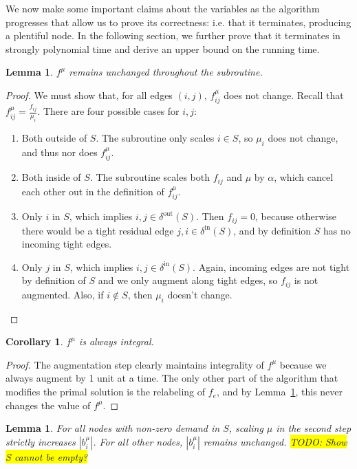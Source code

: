 \documentclass[11pt]{article}
\newtheorem{corollary}{Corollary}[theorem]
\newtheorem{lemma}[theorem]{Lemma}
\theoremstyle{definition}
\theoremstyle{definition}
\newcommand{\biu}{b_{i}^{\mu}}
\newcommand{\din}{\delta^{\text{in}}}
\newcommand{\dout}{\delta^{\text{out}}}
\newcommand{\fiju}{f_{ij}^{\mu}}
\newcommand{\todo}[1]{\colorbox{yellow}{TODO: #1}}
\begin{document}
We now make some important claims about the variables as the algorithm
progresses that allow us to prove its correctness: i.e. that it terminates,
producing a plentiful node.
In the following section,
we further prove that it terminates in strongly polynomial time and derive
an upper bound on the running time.

\begin{lemma}
$f^{\mu}$ remains unchanged throughout the subroutine.
\label{lem:fsame}
\end{lemma} 
\begin{proof}
	We must show that, for all edges $(i,j)$, $f_{ij}^{\mu}$ does not change.
	Recall that $f_{ij}^{\mu} = \frac{f_{ij}}{\mu_i}$. There
	are four possible cases for $i,j$:
	\begin{enumerate}
		\item Both outside of $S$. The subroutine only scales $i \in S$, so $\mu_i$ 
			does not change, and thus nor does $\fiju$.
		\item Both inside of $S$. The subroutine scales both $f_{ij}$ and $\mu$ by
			$\alpha$, which cancel each other out in the definition of $\fiju$.
		\item Only $i$ in $S$, which implies $i,j \in \dout(S)$. Then $f_{ij}=0$,
			because otherwise there would be a tight residual edge $j,i \in \din(S)$,
			and by definition $S$ has no incoming tight edges.
		\item Only $j$ in $S$, which implies $i,j \in \din(S)$. Again, incoming edges
			are not tight by definition of $S$ and we only augment along tight edges,
			so $f_{ij}$ is not augmented. Also, if $i \notin S$, then $\mu_i$ doesn't
			change.
	\end{enumerate}
\end{proof}
\begin{corollary}
$f^{\mu}$ is always integral.
\end{corollary}
\begin{proof}
The augmentation step clearly maintains integrality of $f^{\mu}$ because we
always augment by 1 unit at a time. The only other part of the algorithm that
modifies the primal solution is the relabeling of $f_e$, and by
Lemma~\ref{lem:fsame}, this never changes the value of $f^{\mu}$.
\end{proof}
\begin{lemma}
	\label{lem:scaling}
	For all nodes with non-zero demand in $S$, scaling $\mu$ in the second step
	strictly increases $|\biu|$. For all other nodes, $|\biu|$ remains unchanged.
	\todo{Show S cannot be empty?}
\end{lemma}
\end{document}
